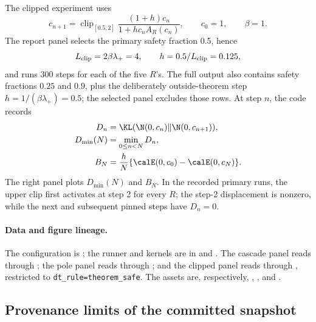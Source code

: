 The clipped experiment uses
\[
  c_{n+1}=\operatorname{clip}_{[0.5,2]}
  \frac{(1+h)c_n}{1+hc_nA_R(c_n)},
  \qquad c_0=1,\qquad \beta=1.
\]
The report panel selects the primary safety fraction 0.5, hence
\[
  L_{\rm clip}=2\beta\lambda_+=4,\qquad
  h=0.5/L_{\rm clip}=0.125,
\]
and runs 300 steps for each of the five \(R\)'s.  The full output also contains
safety fractions \(0.25\) and \(0.9\), plus the deliberately outside-theorem
step \(h=1/(\beta\lambda_+)=0.5\); the selected panel excludes those rows.  At
step \(n\), the code
records
\begin{align*}
  D_n&=\KL(\N(0,c_n)\|\N(0,c_{n+1})),\\
  D_{\min}(N)&=\min_{0\leq n<N}D_n,\\
  B_N&=\frac{h}{N}\{\calE(0,c_0)-\calE(0,c_N)\}.
\end{align*}
The right panel plots \(D_{\min}(N)\) and \(B_N\).  In the recorded primary
runs, the upper clip first activates at step 2 for every \(R\); the step-2
displacement is nonzero, while the next and subsequent pinned steps have
\(D_n=0\).

\paragraph{Data and figure lineage.}
\begingroup\small\raggedright
The configuration is
;
the runner and kernels are in
 and
.  The cascade panel reads
 through
; the pole panel reads
through ; and the clipped panel reads
through , restricted to
\texttt{dt\_rule=theorem\_safe}.  The assets are, respectively,
,
, and
.
\par\endgroup

\subsection{Provenance limits of the committed snapshot}

